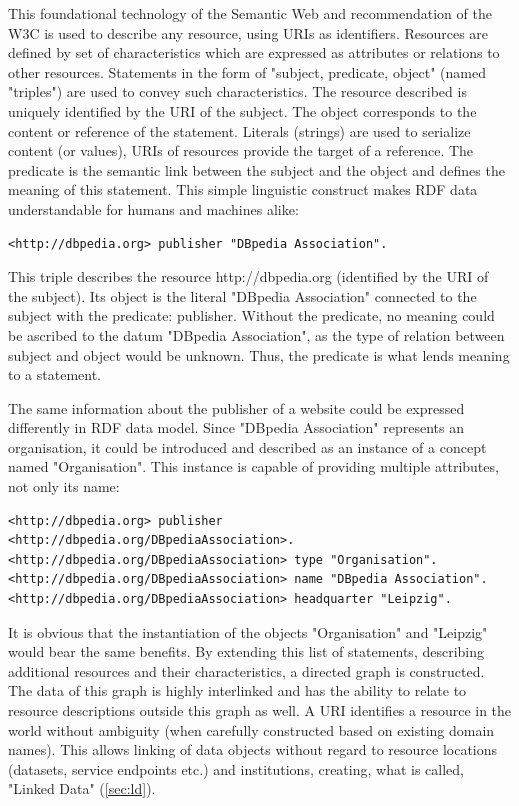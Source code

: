 \documentclass[a4paper,english,twoside,BCOR1.5cm,headsepline,DIV12,appendixprefix,final,12pt]{scrbook}
\begin{document}
This foundational technology of the Semantic Web and recommendation of the W3C \cite{RDF11} is used to describe any resource, using URIs as identifiers. Resources are defined by set of characteristics which are expressed as attributes or relations to other resources. Statements in the form of "subject, predicate, object" (named "triples") are used to convey such characteristics. The resource described is uniquely identified by the URI of the subject. The object corresponds to the content or reference of the statement. Literals (strings) are used to serialize content (or values), URIs of resources provide the target of a reference. The predicate is the semantic link between the subject and the object and defines the meaning of this statement.
This simple linguistic construct makes RDF data understandable for humans and machines alike:

\begin{lstlisting}[language=ttl, label=lst:triple,linewidth=\columnwidth,breaklines=true]
<http://dbpedia.org> publisher "DBpedia Association".
\end{lstlisting}

This triple describes the resource http://dbpedia.org (identified by the URI of the subject). Its object is the literal "DBpedia Association" connected to the subject with the predicate: publisher. Without the predicate, no meaning could be ascribed to the datum "DBpedia Association", as the type of relation between subject and object would be unknown. Thus, the predicate is what lends meaning to a statement.

The same information about the publisher of a website could be expressed differently in RDF data model. Since "DBpedia Association" represents an organisation, it could be introduced and described as an instance of a concept named "Organisation". This instance is capable of providing multiple attributes, not only its name:

\begin{lstlisting}[language=ttl, label=lst:graph,linewidth=\columnwidth,breaklines=true]
<http://dbpedia.org> publisher <http://dbpedia.org/DBpediaAssociation>.
<http://dbpedia.org/DBpediaAssociation> type "Organisation".
<http://dbpedia.org/DBpediaAssociation> name "DBpedia Association".
<http://dbpedia.org/DBpediaAssociation> headquarter "Leipzig". 
\end{lstlisting}

It is obvious that the instantiation of the objects "Organisation" and "Leipzig" would bear the same benefits. 
By extending this list of statements, describing additional resources and their characteristics, a directed graph is constructed. The data of this graph is highly interlinked and has the ability to relate to resource descriptions outside this graph as well. A URI identifies a resource in the world without ambiguity (when carefully constructed based on existing domain names). This allows linking of data objects without regard to resource locations (datasets, service endpoints etc.) and institutions, creating, what is called, "Linked Data" (\cref{sec:ld}).
\end{document}
